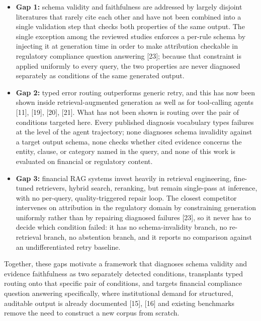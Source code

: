 \documentclass[11pt,a4paper]{article}
\begin{document}
\begin{itemize}
\item \textbf{Gap 1:} schema validity and faithfulness are addressed by largely disjoint
literatures that rarely cite each other and have not been combined into a single
validation step that checks both properties of the same output. The single exception
among the reviewed studies enforces a per-rule schema by injecting it at generation time
in order to make attribution checkable in regulatory compliance question answering [23];
because that constraint is applied uniformly to every query, the two properties are never
diagnosed separately as conditions of the same generated output.

\item \textbf{Gap 2:} typed error routing outperforms generic retry, and this has now
been shown inside retrieval-augmented generation as well as for tool-calling agents [11],
[19], [20], [21]. What has not been shown is routing over the pair of conditions targeted
here. Every published diagnosis vocabulary types failures at the level of the agent
trajectory; none diagnoses schema invalidity against a target output schema, none checks
whether cited evidence concerns the entity, clause, or category named in the query, and
none of this work is evaluated on financial or regulatory content.

\item \textbf{Gap 3:} financial RAG systems invest heavily in retrieval engineering,
fine-tuned retrievers, hybrid search, reranking, but remain single-pass at inference,
with no per-query, quality-triggered repair loop. The closest competitor intervenes on
attribution in the regulatory domain by constraining generation uniformly rather than by
repairing diagnosed failures [23], so it never has to decide which condition failed: it
has no schema-invalidity branch, no re-retrieval branch, no abstention branch, and it
reports no comparison against an undifferentiated retry baseline.
\end{itemize}

Together, these gaps motivate a framework that diagnoses schema validity and evidence
faithfulness as two separately detected conditions, transplants typed routing onto that
specific pair of conditions, and targets financial compliance question answering
specifically, where institutional demand for structured, auditable output is already
documented [15], [16] and existing benchmarks remove the need to construct a new corpus
from scratch.
\end{document}
